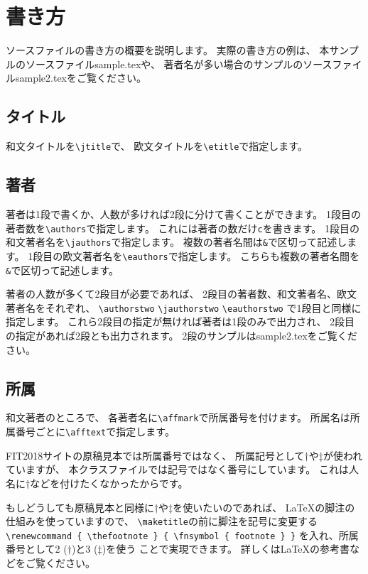 \documentclass{FITpaper}
\begin{document}
\section{書き方}

ソースファイルの書き方の概要を説明します。
実際の書き方の例は、
本サンプルのソースファイルsample.texや、
著者名が多い場合のサンプルのソースファイルsample2.texをご覧ください。

\subsection{タイトル}

和文タイトルを\texttt{\textbackslash jtitle}で、
欧文タイトルを\texttt{\textbackslash etitle}で指定します。

\subsection{著者}

著者は1段で書くか、人数が多ければ2段に分けて書くことができます。
1段目の著者数を\texttt{\textbackslash authors}で指定します。
これには著者の数だけ\texttt{c}を書きます。
1段目の和文著者名を\texttt{\textbackslash jauthors}で指定します。
複数の著者名間は\texttt{\&}で区切って記述します。
1段目の欧文著者名を\texttt{\textbackslash eauthors}で指定します。
こちらも複数の著者名間を\texttt{\&}で区切って記述します。

著者の人数が多くて2段目が必要であれば、
2段目の著者数、和文著者名、欧文著者名をそれぞれ、
\texttt{\textbackslash authorstwo}
\texttt{\textbackslash jauthorstwo}
\texttt{\textbackslash eauthorstwo}
で1段目と同様に指定します。
これら2段目の指定が無ければ著者は1段のみで出力され、
2段目の指定があれば2段とも出力されます。
2段のサンプルはsample2.texをご覧ください。

\subsection{所属}

和文著者のところで、
各著者名に\texttt{\textbackslash af\mbox{}fmark}で所属番号を付けます。
所属名は所属番号ごとに\texttt{\textbackslash af\mbox{}ftext}で指定します。

FIT2018サイトの原稿見本では所属番号ではなく、
所属記号として$\dag$や$\ddag$が使われていますが、
本クラスファイルでは記号ではなく番号にしています。
これは人名に$\dag$などを付けたくなかったからです。

もしどうしても原稿見本と同様に$\dag$や$\ddag$を使いたいのであれば、
\LaTeX の脚注の仕組みを使っていますので、
\texttt{\textbackslash maketitle}の前に脚注を記号に変更する
\texttt{\textbackslash renewcommand \{
  \textbackslash thefootnote \} \{
  \textbackslash fnsymbol \{ footnote \} \}}
を入れ、所属番号として2 ($\dag$)と3 ($\ddag$)を使う
ことで実現できます。
詳しくは\LaTeX の参考書などをご覧ください。
\end{document}
